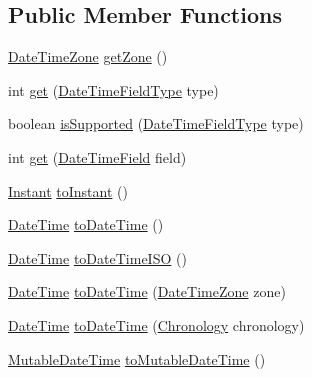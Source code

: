 \subsection*{Public Member Functions}
\begin{DoxyCompactItemize}
\item 
\hyperlink{classorg_1_1joda_1_1time_1_1_date_time_zone}{Date\-Time\-Zone} \hyperlink{classorg_1_1joda_1_1time_1_1base_1_1_abstract_instant_aca3c8882a1c8944e4af28db73fefa7a3}{get\-Zone} ()
\item 
int \hyperlink{classorg_1_1joda_1_1time_1_1base_1_1_abstract_instant_a9c5cfc1f9ef4d4fb8b56481b7acb871b}{get} (\hyperlink{classorg_1_1joda_1_1time_1_1_date_time_field_type}{Date\-Time\-Field\-Type} type)
\item 
boolean \hyperlink{classorg_1_1joda_1_1time_1_1base_1_1_abstract_instant_a3053c933633ff8a8c632da1275ca79f4}{is\-Supported} (\hyperlink{classorg_1_1joda_1_1time_1_1_date_time_field_type}{Date\-Time\-Field\-Type} type)
\item 
int \hyperlink{classorg_1_1joda_1_1time_1_1base_1_1_abstract_instant_ab362bca5c1ed8fd025cbc9a175c07f99}{get} (\hyperlink{classorg_1_1joda_1_1time_1_1_date_time_field}{Date\-Time\-Field} field)
\item 
\hyperlink{classorg_1_1joda_1_1time_1_1_instant}{Instant} \hyperlink{classorg_1_1joda_1_1time_1_1base_1_1_abstract_instant_a07e98b1e62a1043468415bf1e398e76a}{to\-Instant} ()
\item 
\hyperlink{classorg_1_1joda_1_1time_1_1_date_time}{Date\-Time} \hyperlink{classorg_1_1joda_1_1time_1_1base_1_1_abstract_instant_a739b32edbeb4ceb4b4afe3a7c402db75}{to\-Date\-Time} ()
\item 
\hyperlink{classorg_1_1joda_1_1time_1_1_date_time}{Date\-Time} \hyperlink{classorg_1_1joda_1_1time_1_1base_1_1_abstract_instant_a057cc447293c65f522eaebc5db5d3d8b}{to\-Date\-Time\-I\-S\-O} ()
\item 
\hyperlink{classorg_1_1joda_1_1time_1_1_date_time}{Date\-Time} \hyperlink{classorg_1_1joda_1_1time_1_1base_1_1_abstract_instant_a325eb95f0ca57a054f4cac05ca68d411}{to\-Date\-Time} (\hyperlink{classorg_1_1joda_1_1time_1_1_date_time_zone}{Date\-Time\-Zone} zone)
\item 
\hyperlink{classorg_1_1joda_1_1time_1_1_date_time}{Date\-Time} \hyperlink{classorg_1_1joda_1_1time_1_1base_1_1_abstract_instant_ab4b03a6efb30b2a0fc1a4d4c99dde088}{to\-Date\-Time} (\hyperlink{classorg_1_1joda_1_1time_1_1_chronology}{Chronology} chronology)
\item 
\hyperlink{classorg_1_1joda_1_1time_1_1_mutable_date_time}{Mutable\-Date\-Time} \hyperlink{classorg_1_1joda_1_1time_1_1base_1_1_abstract_instant_a2321fb5ab1e53a55d6cf7f24302254d7}{to\-Mutable\-Date\-Time} ()

\end{DoxyCompactItemize}
